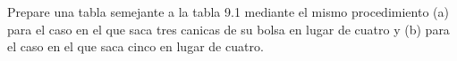 \item Prepare una tabla semejante a la tabla 9.1 mediante el mismo procedimiento (a) para el caso en el que saca tres canicas de su bolsa en lugar de cuatro y (b) para el caso en el que saca cinco en lugar de cuatro.
